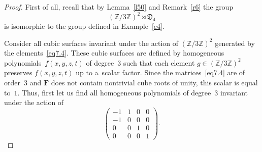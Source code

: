 \documentclass[10pt,a4paper]{amsart}
\begin{document}
\begin{proof}
First of all, recall that by Lemma~\ref{l50} and Remark~\ref{r6} the group
$$
(\mathbb{Z}/3\mathbb{Z})^2 \rtimes \mathfrak{D}_4
$$
is isomorphic to the group defined in Example~\ref{e4}.

Consider all cubic surfaces invariant under the action of $(\mathbb{Z}/3\mathbb{Z})^2$ generated by the elements~\eqref{eq7.4}. These cubic surfaces are defined by homogeneous polynomials~$f(x,y,z,t)$ of degree~$3$ such that each element $g \in (\mathbb{Z}/3\mathbb{Z})^2$ preserves $f(x,y,z,t)$ up to a~scalar factor. Since the matrices~\eqref{eq7.4} are of order~$3$ and $\mathbf{F}$ does not contain nontrivial cube roots of unity, this scalar is equal to~$1$. Thus, first let us find all homogeneous polynomials of degree~$3$ invariant under the action of
\begin{equation}
\label{eq7.7}
\begin{pmatrix}
-1 & 1 & 0 & 0\\
-1 & 0 & 0 & 0\\
0 & 0 & 1 & 0\\
0 & 0 & 0 & 1
\end{pmatrix}.
\end{equation}


\end{proof}
\end{document}

